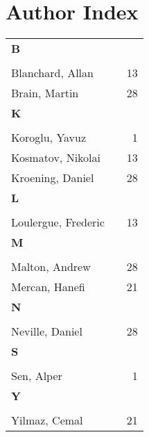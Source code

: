 \section*{Author Index}
\begin{longtable}{lp{10em}r}
\\
\textbf{B} \\*
\\
Blanchard, Allan & & 13 
\\
Brain, Martin & & 28 
\\
\textbf{K} \\*
\\
Koroglu, Yavuz & & 1 
\\
Kosmatov, Nikolai & & 13 
\\
Kroening, Daniel & & 28 
\\
\textbf{L} \\*
\\
Loulergue, Frederic & & 13 
\\
\textbf{M} \\*
\\
Malton, Andrew & & 28 
\\
Mercan, Hanefi & & 21 
\\
\textbf{N} \\*
\\
Neville, Daniel & & 28 
\\
\textbf{S} \\*
\\
Sen, Alper & & 1 
\\
\textbf{Y} \\*
\\
Yilmaz, Cemal & & 21 
\end{longtable}
